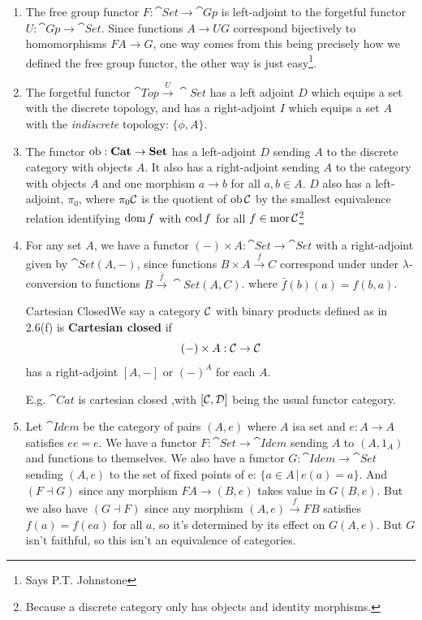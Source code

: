 \documentclass{article}
\begin{document}
\begin{exs}\hspace{0.1cm}
    \begin{enumerate}
        \item[(a)] The free group functor $F : \cat{Set} \to \cat{Gp}$ is left-adjoint to the forgetful functor $U: \cat{Gp} \to \cat{Set}$. Since functions $A \to UG$ correspond bijectively to homomorphisms $FA \to G$, one way comes from this being precisely how we defined the free group functor, the other way is just easy\footnote{Says P.T. Johnstone}.
        \item[(b)] The forgetful functor $\cat{Top} \xrightarrow{U} \cat{Set}$ has a left adjoint $D$ which equips a set with the discrete topology, and has a right-adjoint $I$ which equips a set $A$ with the \textit{indiscrete} topology: $\{\phi, A\}$.
        \item[(c)] The functor $\operatorname{ob} : \textbf{Cat} \to \textbf{Set}$ has a left-adjoint $D$ sending $A$ to the discrete category with objects $A$. It also has a right-adjoint sending $A$ to the category with objects $A$ and one morphism $a \to b$ for all $a, b \in A$. $D$ also has a left-adjoint, $\pi_{0}$, where $\pi_{0}\mathcal{C}$ is the quotient of $\operatorname{ob} \mathcal{C}$ by the smallest equivalence relation identifying $\operatorname{dom} f$ with $\operatorname{cod} f$ for all $f \in \operatorname{mor} \mathcal{C}$\footnote{Because a discrete category only has objects and identity morphisms.}
        \item[(d)] For any set $A$, we have a functor $(-) \times A : \cat{Set} \to \cat{Set}$ with a right-adjoint given by $\cat{Set}(A, - )$, since functions $B \times A \xrightarrow{f} C$ correspond under under $\lambda$-conversion to functions $B \xrightarrow{\bar f} \cat{Set}(A,C)$. where $\bar f (b)(a) = f(b,a)$. \begin{fancydefine*}{Cartesian Closed}We say a category $\mathcal{C}$ with binary products defined as in 2.6(f) is \textbf{Cartesian closed} if \[ (-) \times A : \mathcal{C} \to \mathcal{C} \] has a right-adjoint $[A,-]$ or $(-)^{A}$ for each $A$.
        \end{fancydefine*}
        E.g. $\cat{Cat}$ is cartesian closed ,with $[\mathcal{C},\mathcal{D}]$ being the usual functor category.
        \item[(e)] \newlec Let $\cat{Idem}$ be the category of pairs $(A,e)$ where $A$ isa set and $e: A \to A$ satisfies $ee=e$. We have a functor $F : \cat{Set} \to \cat{Idem}$ sending $A$ to $(A,1_{A})$ and functions to themselves. We also have a functor $G : \cat{Idem} \to \cat{Set}$ sending $(A,e)$ to the set of fixed points of e: $\{ a \in A \, | \, e(a)=a\}$. And $(F \dashv G)$ since any morphism $FA \to (B,e)$ takes value in $G(B,e)$. But we also have $(G \dashv F)$ since any morphism $(A,e) \xrightarrow{f} FB$ satisfies $f(a)=f(ea)$ for all $a$, so it's determined by its effect on $G(A,e)$. But $G$ isn't faithful, so this isn't an equivalence of categories.

\end{enumerate}
\end{exs}
\end{document}
